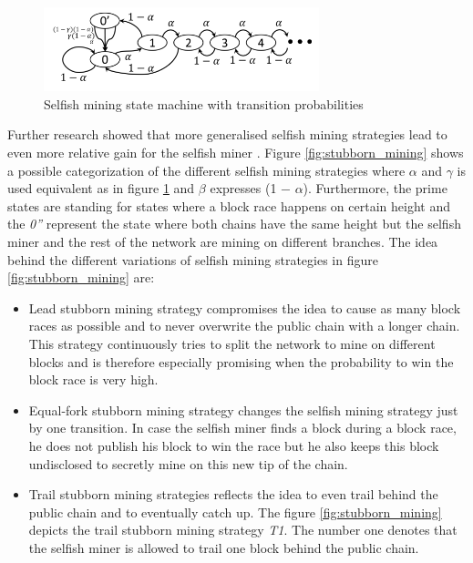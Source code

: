 \documentclass{scrartcl}
\begin{document}
\begin{figure}[t]
\includegraphics[width=8cm]{figures/selfish_mining}
\centering
\caption{Selfish mining state machine with transition probabilities \cite{eyal2014majority}}
\label{fig:selfish_mining}
\end{figure}


Further research showed that more generalised selfish mining strategies lead to even more relative gain for the selfish miner \cite{nayak2016stubborn,sapirshtein2016optimal, gervais2015tampering, gervais2016security, bahack2013theoretical}.
Figure \ref{fig:stubborn_mining} shows a possible categorization of the different selfish mining strategies where $\alpha$ and $\gamma$ is used equivalent as in figure \ref{fig:selfish_mining} and $\beta$ expresses (1 − $\alpha$).
Furthermore, the prime states are standing for states where a block race happens on certain height and the \textit{0''} represent the state where both chains have the same height but the selfish miner and the rest of the network are mining on different branches.
The idea behind the different variations of selfish mining strategies in figure \ref{fig:stubborn_mining} are:
\begin{itemize}
\item Lead stubborn mining strategy compromises the idea to cause as many block races as possible and to never overwrite the public chain with a longer chain.
This strategy continuously tries to split the network to mine on different blocks and is therefore especially promising when the probability to win the block race is very high.
\item Equal-fork stubborn mining strategy changes the selfish mining strategy just by one transition.
In case the selfish miner finds a block during a block race, he does not publish his block to win the race but he also keeps this block undisclosed to secretly mine on this new tip of the chain.
\item Trail stubborn mining strategies reflects the idea to even trail behind the public chain and to eventually catch up.
The figure \ref{fig:stubborn_mining} depicts the trail stubborn mining strategy \textit{T1}.
The number one denotes that the selfish miner is allowed to trail one block behind the public chain.
\end{itemize}
\end{document}

